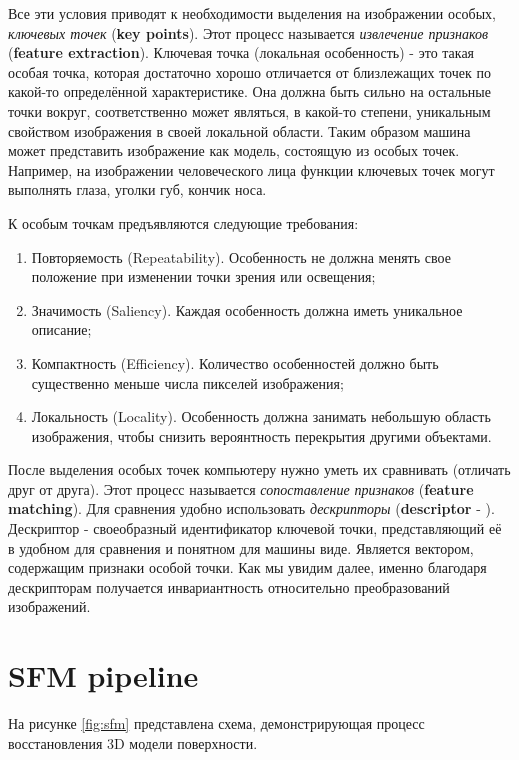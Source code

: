 Все эти условия приводят к необходимости выделения на изображении особых, \textit{ключевых точек} (\textbf{key points}). Этот процесс называется \textit{извлечение признаков} (\textbf{feature extraction}). Ключевая точка (локальная особенность) - это такая особая точка, которая достаточно хорошо отличается от близлежащих точек по какой-то определённой характеристике. Она должна быть сильно  на остальные точки вокруг, соответственно может являться, в какой-то степени, уникальным свойством изображения в своей локальной области. Таким образом машина может представить изображение как модель, состоящую из особых точек. Например, на изображении человеческого лица функции ключевых точек могут выполнять глаза, уголки губ, кончик носа.

\vspace{1mm}
К особым точкам предъявляются следующие требования:

\begin{enumerate}
    \item Повторяемость (Repeatability). Особенность не должна менять свое положение при изменении точки зрения или освещения;
    \item Значимость (Saliency). Каждая особенность должна иметь уникальное описание;
    \item Компактность (Efficiency). Количество особенностей должно быть существенно меньше числа пикселей изображения;
    \item Локальность (Locality). Особенность должна занимать небольшую область изображения, чтобы снизить вероянтность перекрытия другими объектами.
\end{enumerate}

После выделения особых точек компьютеру нужно уметь их сравнивать (отличать друг от друга). Этот процесс называется \textit{сопоставление признаков} (\textbf{feature matching}). Для сравнения удобно использовать \textit{дескрипторы} (\textbf{descriptor} - ). Дескриптор - своеобразный идентификатор ключевой точки, представляющий её в удобном для сравнения и понятном для машины виде. Является вектором, содержащим признаки особой точки. Как мы увидим далее, именно благодаря дескрипторам получается инвариантность относительно преобразований изображений.

\section{SFM pipeline}

На рисунке \ref{fig:sfm} представлена схема, демонстрирующая процесс восстановления 3D модели поверхности. 

